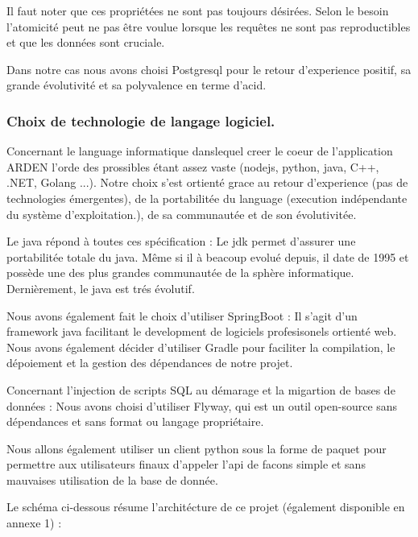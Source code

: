 Il faut noter que ces propriétées ne sont pas toujours désirées. Selon le besoin l'atomicité peut ne pas être voulue lorsque les requêtes ne sont pas reproductibles et que les données sont cruciale.

Dans notre cas nous avons choisi Postgresql pour le retour d'experience positif, sa grande évolutivité et sa polyvalence en terme d'\gls{acid}.

\subsubsection{Choix de technologie de langage logiciel.}

Concernant le language informatique danslequel creer le coeur de l'application ARDEN l'orde des prossibles étant assez vaste (nodejs, python, java, C++, .NET, Golang ...). Notre choix s'est ortienté grace au retour d'experience (pas de technologies émergentes), de la portabilitée du language (execution indépendante du système d'exploitation.), de sa communautée et de son évolutivitée.

Le java répond à toutes ces spécification : 
Le \gls{jdk} permet d'assurer une portabilitée totale du java. Même si il à beacoup evolué depuis, il date de 1995 et possède une des plus grandes communautée de la sphère informatique. Dernièrement, le java est trés évolutif. 

Nous avons également fait le choix d'utiliser SpringBoot : Il s'agit d'un framework java facilitant le development de logiciels profesisonels ortienté web.
Nous avons également décider d'utiliser Gradle pour faciliter la compilation, le dépoiement et la gestion des dépendances de notre projet.

Concernant l'injection de scripts SQL au démarage et la migartion de bases de données : Nous avons choisi d'utiliser Flyway, qui est un outil open-source sans dépendances et sans format ou langage propriétaire.

Nous allons également utiliser un client python sous la forme de paquet pour permettre aux utilisateurs finaux d'appeler l'api de facons simple et sans mauvaises utilisation de la base de donnée.

Le schéma ci-dessous résume l'architécture de ce projet (également disponible en annexe 1) : 

